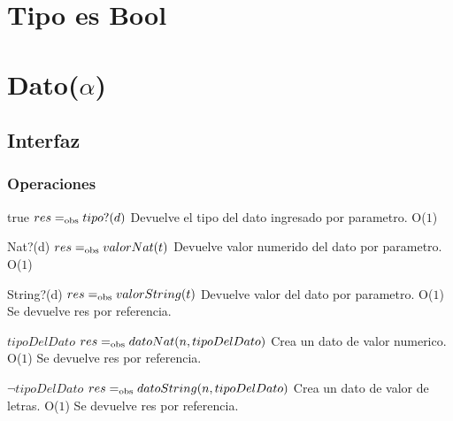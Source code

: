 

\section{Tipo es Bool}


\section{Dato($\alpha$)}

\subsection{Interfaz}




\subsubsection*{Operaciones}



 {true}
 {$res =_{\mathrm{obs}} tipo?(d)$}
 {Devuelve el tipo del dato ingresado por parametro.}
 {O($1$)}
 {}

 {Nat?(d)}
 {$res =_{\mathrm{obs}} valorNat(t)$}
 {Devuelve valor numerido del dato por parametro.}
 {O($1$)}
 {}

 {String?(d)}
 {$res =_{\mathrm{obs}} valorString(t)$}
 {Devuelve valor del dato por parametro.}
 {O($1$)}
 {Se devuelve res por referencia.}
 

 {$tipoDelDato$}
 {$res =_{\mathrm{obs}} datoNat(n,tipoDelDato)$}
 {Crea un dato de valor numerico.}
 {O($1$)}
 {Se devuelve res por referencia.}
 
 {$\neg tipoDelDato$}
 {$res =_{\mathrm{obs}} datoString(n,tipoDelDato)$}
 {Crea un dato de valor de letras.}
 {O($1$)}
 {Se devuelve res por referencia.}

